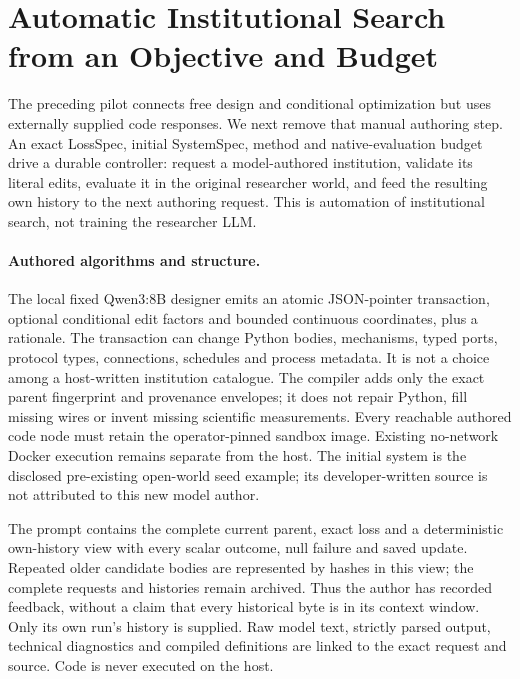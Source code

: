 \section{Automatic Institutional Search from an Objective and Budget}
\label{sec:automatic-search-v14}

The preceding pilot connects free design and conditional optimization but uses
externally supplied code responses. We next remove that manual authoring
step. An exact LossSpec, initial SystemSpec, method and native-evaluation
budget drive a durable controller: request a model-authored institution,
validate its literal edits, evaluate it in the original researcher world,
and feed the resulting own history to the next authoring request.
This is automation of institutional search, not training the researcher LLM.

\paragraph{Authored algorithms and structure.}
The local fixed Qwen3:8B designer emits an atomic JSON-pointer transaction,
optional conditional edit factors and bounded continuous coordinates, plus
a rationale. The transaction can change Python bodies, mechanisms, typed
ports, protocol types, connections, schedules and process metadata. It is
not a choice among a host-written institution catalogue. The compiler adds
only the exact parent fingerprint and provenance envelopes; it does not
repair Python, fill missing wires or invent missing scientific measurements.
Every reachable authored code node must retain the operator-pinned sandbox
image. Existing no-network Docker execution remains separate from the host.
The initial system is the disclosed pre-existing open-world seed example;
its developer-written source is not attributed to this new model author.

The prompt contains the complete current parent, exact loss and a deterministic
own-history view with every scalar outcome, null failure and saved update.
Repeated older candidate bodies are represented by hashes in this view;
the complete requests and histories remain archived. Thus the author has
recorded feedback, without a claim that every historical byte is in its
context window. Only its own run's history is supplied. Raw model text,
strictly parsed output, technical diagnostics and compiled definitions are
linked to the exact request and source. Code is never executed on the host.

